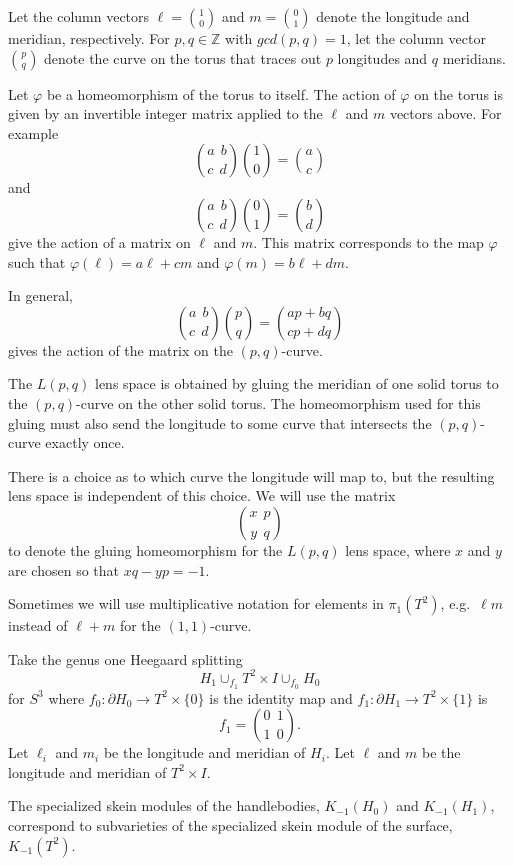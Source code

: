 \documentclass{slides}
\begin{document}
\begin{slide}
Let the column vectors
$\ell = \binom{1}{0}$ and $m = \binom{0}{1}$
denote the longitude and meridian, respectively.
For $p, q \in \mathbb{Z}$
with $gcd(p,q)=1$, let the column vector
$\binom{p}{q}$
denote the
curve on the torus that traces out $p$
longitudes and $q$ meridians.

Let $\varphi$ be a homeomorphism of
the torus to itself.  The action of $\varphi$ on the torus
is given by an invertible integer matrix applied
to the $\ell$ and $m$ vectors above.
For example
$$
\binom{a~~b}{c~~d}
\binom{1}{0}
=
\binom{a}{c}
$$
and
$$
\binom{a~~b}{c~~d}
\binom{0}{1}
=
\binom{b}{d}
$$
give the action of a matrix on $\ell$ and $m$.  This matrix corresponds to
the map $\varphi$ such that $\varphi(\ell) = a \ell + c m$ and
$\varphi(m) = b \ell + d m$.
\end{slide}

\begin{slide}
In general,
$$
\binom{a~~b}{c~~d}
\binom{p}{q}
=
\binom{ap+bq}{cp+dq}
$$
gives the action of the matrix on the $(p,q)$-curve.

The $L(p,q)$ lens space is obtained by gluing the meridian of
one solid torus to the $(p,q)$-curve on the
other solid torus.  The homeomorphism used for this
gluing must also send the longitude to some curve that intersects
the $(p,q)$-curve exactly once.

There is a
choice as to which curve the longitude will map to,
but the resulting lens space is independent of this choice.
We will use the matrix
$$\binom{x~~p}{y~~q}$$
to denote the gluing homeomorphism for the $L(p,q)$ lens space,
where $x$ and $y$ are
chosen so that $xq - yp = -1$.
\end{slide}

\begin{slide}
Sometimes we will use multiplicative
notation for elements in $\pi_1(T^2)$, e.g.\ $\ell m$ instead
of $\ell + m$ for the $(1,1)$-curve.

Take the genus one Heegaard splitting
$$H_1 \cup_{f_1} T^2 \times I \cup_{f_0} H_0$$ for $S^3$ where
$f_0 : \partial H_0 \to T^2 \times \{0\}$ is the identity
map and
$f_1 : \partial H_1 \to T^2 \times \{1\}$ is
$$f_1 = \binom{0~~1}{1~~0}.$$
Let $\ell_i$ and $m_i$ be the longitude and meridian of $H_i$.
Let $\ell$ and $m$ be the longitude and meridian of $T^2 \times I$.

The specialized skein modules of the handlebodies,
$K_{-1}(H_0)$ and $K_{-1}(H_1)$, correspond to subvarieties of
the specialized skein module of the surface,
$K_{-1}(T^2)$.
\end{slide}
\end{document}
